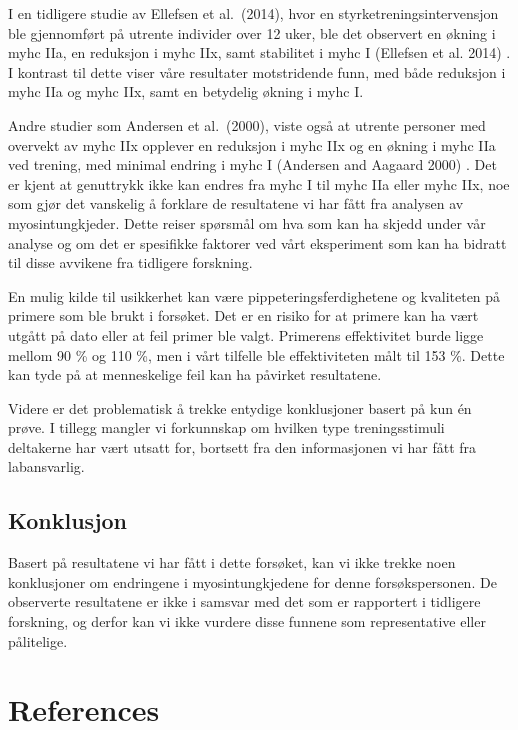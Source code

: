 \documentclass[
  letterpaper,
  DIV=11,
  numbers=noendperiod]{scrreprt}
\begin{document}
I en tidligere studie av Ellefsen et al.~(2014), hvor en
styrketreningsintervensjon ble gjennomført på utrente individer over 12
uker, ble det observert en økning i myhc IIa, en reduksjon i myhc IIx,
samt stabilitet i myhc I (Ellefsen et al. 2014) . I kontrast til dette
viser våre resultater motstridende funn, med både reduksjon i myhc IIa
og myhc IIx, samt en betydelig økning i myhc I.

Andre studier som Andersen et al.~(2000), viste også at utrente personer
med overvekt av myhc IIx opplever en reduksjon i myhc IIx og en økning i
myhc IIa ved trening, med minimal endring i myhc I (Andersen and Aagaard
2000) . Det er kjent at genuttrykk ikke kan endres fra myhc I til myhc
IIa eller myhc IIx, noe som gjør det vanskelig å forklare de resultatene
vi har fått fra analysen av myosintungkjeder. Dette reiser spørsmål om
hva som kan ha skjedd under vår analyse og om det er spesifikke faktorer
ved vårt eksperiment som kan ha bidratt til disse avvikene fra tidligere
forskning.

En mulig kilde til usikkerhet kan være pippeteringsferdighetene og
kvaliteten på primere som ble brukt i forsøket. Det er en risiko for at
primere kan ha vært utgått på dato eller at feil primer ble valgt.
Primerens effektivitet burde ligge mellom 90 \% og 110 \%, men i vårt
tilfelle ble effektiviteten målt til 153 \%. Dette kan tyde på at
menneskelige feil kan ha påvirket resultatene.

Videre er det problematisk å trekke entydige konklusjoner basert på kun
én prøve. I tillegg mangler vi forkunnskap om hvilken type
treningsstimuli deltakerne har vært utsatt for, bortsett fra den
informasjonen vi har fått fra labansvarlig.

\section{Konklusjon}\label{konklusjon}

Basert på resultatene vi har fått i dette forsøket, kan vi ikke trekke
noen konklusjoner om endringene i myosintungkjedene for denne
forsøkspersonen. De observerte resultatene er ikke i samsvar med det som
er rapportert i tidligere forskning, og derfor kan vi ikke vurdere disse
funnene som representative eller pålitelige.


\chapter*{References}\label{references}
\end{document}
